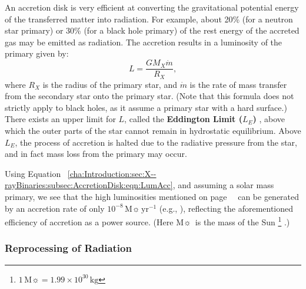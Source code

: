 \vspace{\myparskip}

An accretion disk is very efficient at converting the gravitational potential energy of the transferred matter into radiation. For example, about 20\% (for a neutron star primary) or 30\% (for a
black hole primary) of the rest energy of the accreted gas may be
emitted as radiation. The accretion results in a luminosity of the primary given by:
\begin{equation}
\label{cha:Introduction:sec:X--rayBinaries:subsec:AccretionDisk:eqn:LumAcc}
L = \frac{G M_X \dot{m}}{R_X},
\end{equation}
where $R_X$ is the radius of the primary star, and $\dot{m}$ is the
rate of mass transfer from the secondary star onto the primary star. %
(Note that this formula does not strictly apply to black holes, as it assume a
primary star with a hard surface.) %
There exists an upper limit for $L$, called the \textbf{Eddington
Limit ($L_{E}$)}%
\label{cha:Introduction:sec:BinaryStarSystems:subsec:AccretionDisk:topic:L_E}%
, above which the outer parts of the star cannot remain in hydrostatic
equilibrium. Above $L_{E}$, the process of accretion is halted due to
the radiative pressure from the star, and in fact mass loss from the primary may occur. %

\vspace{\myparskip}

Using Equation~%
\vref{cha:Introduction:sec:X--rayBinaries:subsec:AccretionDisk:eqn:LumAcc}, %
and assuming a solar mass primary, we see
that the high luminosities mentioned on page~%
\pageref{cha:Introduction:sec:X--rayBinaries:subsec:CompactObjects:topic:HighLum}%
\ can be generated by an accretion rate of
only $10^{-8}\,\mathrm{M}\sun\,\mathrm{yr^{-1}}$ (e.g., %
%
), %
reflecting the aforementioned efficiency of accretion as a power
source. (Here $\mathrm{M}\sun$\ is the mass of the Sun%
\footnote{%
\label{cha:Introduction:sec:X--rayBinaries:foot:Msun}
$1\,\mathrm{M}\sun = 1.99 \times 10^{30}\,\mathrm{kg}$}%
.)


\subsubsection{Reprocessing of Radiation}
\label{cha:Introduction:sec:X--rayBinaries:subsec:AccretionDisk:subsubsec:ReprocessingOfRadiation}

